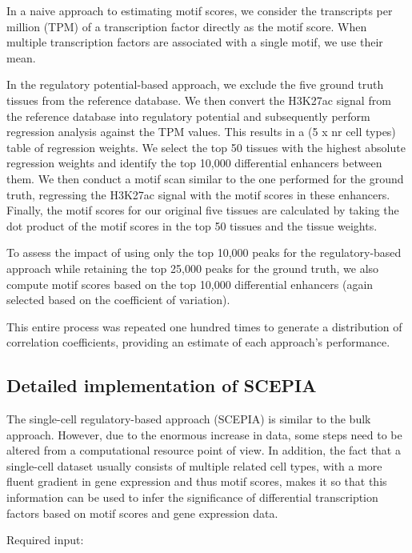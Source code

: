 In a naive approach to estimating motif scores, we consider the transcripts per million (TPM) of a transcription factor directly as the motif score. When multiple transcription factors are associated with a single motif, we use their mean.

In the regulatory potential-based approach, we exclude the five ground truth tissues from the reference database. We then convert the H3K27ac signal from the reference database into regulatory potential and subsequently perform regression analysis against the TPM values. This results in a (5 x nr cell types) table of regression weights. We select the top 50 tissues with the highest absolute regression weights and identify the top 10,000 differential enhancers between them. We then conduct a motif scan similar to the one performed for the ground truth, regressing the H3K27ac signal with the motif scores in these enhancers. Finally, the motif scores for our original five tissues are calculated by taking the dot product of the motif scores in the top 50 tissues and the tissue weights.

To assess the impact of using only the top 10,000 peaks for the regulatory-based approach while retaining the top 25,000 peaks for the ground truth, we also compute motif scores based on the top 10,000 differential enhancers (again selected based on the coefficient of variation).

This entire process was repeated one hundred times to generate a distribution of correlation coefficients, providing an estimate of each approach's performance.

\subsection{Detailed implementation of SCEPIA}

The single-cell regulatory-based approach (SCEPIA) is similar to the bulk approach. However, due to the enormous increase in data, some steps need to be altered from a computational resource point of view. In addition, the fact that a single-cell dataset usually consists of multiple related cell types, with a more fluent gradient in gene expression and thus motif scores, makes it so that this information can be used to infer the significance of differential transcription factors based on motif scores and gene expression data.

\noindent
Required input:

